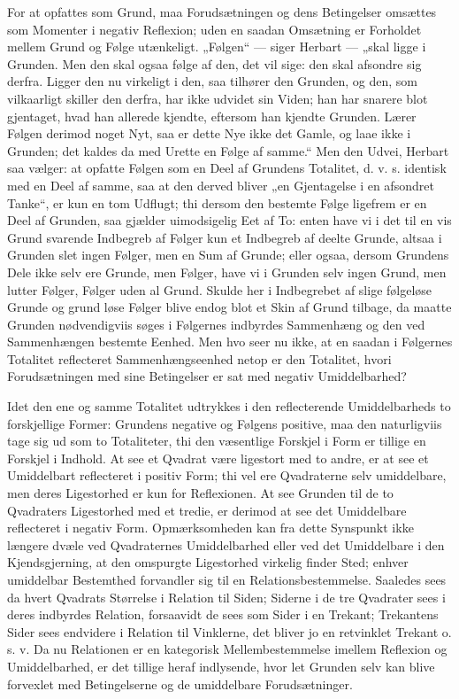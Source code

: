 \documentclass[11pt]{book}
\newcommand{\opage}[1]{\marginnote{\footnotesize\textit{[#1]}}}
\begin{document}
\opage{88} \setcounter{footnote}{0}%
For at opfattes som Grund, maa Forudsætningen og dens
Betingelser omsættes som Momenter i negativ Reflexion; uden
en saadan Omsætning er Forholdet mellem Grund og Følge
utænkeligt. „Følgen“ --- siger Herbart --- „skal ligge i
Grunden. Men den skal ogsaa følge af den, det vil sige: den
skal afsondre sig derfra. Ligger den nu virkeligt i den, saa
tilhører den Grunden, og den, som vilkaarligt skiller den
derfra, har ikke udvidet sin Viden; han har snarere blot
gjentaget, hvad han allerede kjendte, eftersom han kjendte
Grunden. Lærer Følgen derimod noget Nyt, saa er dette Nye
ikke det Gamle, og laae ikke i Grunden; det kaldes da med
Urette en Følge af samme.“ Men den Udvei, Herbart saa
vælger: at opfatte Følgen som en Deel af Grundens Totalitet,
d. v. s. identisk med en Deel af samme, saa at den derved
bliver „en Gjentagelse i en afsondret Tanke“, er kun en tom
Udflugt; thi dersom den bestemte Følge ligefrem er en Deel af
Grunden, saa gjælder uimodsigelig Eet af To: enten have vi i
det til en vis Grund svarende Indbegreb af Følger kun et
Indbegreb af deelte Grunde, altsaa i Grunden slet ingen
Følger, men en Sum af Grunde; eller ogsaa, dersom Grundens
Dele ikke selv ere Grunde, men Følger, have vi i Grunden
selv ingen Grund, men lutter Følger, Følger uden al Grund.
Skulde her i Indbegrebet af slige følgeløse Grunde og
grund\-%
\opage{89} \setcounter{footnote}{0}%
løse Følger blive endog blot et Skin af Grund tilbage, da
maatte Grunden nødvendigviis søges i Følgernes indbyrdes
Sammenhæng og den ved Sammenhængen bestemte Eenhed.
Men hvo seer nu ikke, at en saadan i Følgernes Totalitet
reflecteret Sammenhængseenhed netop er den Totalitet, hvori
Forudsætningen med sine Betingelser er sat med negativ
Umiddelbarhed?

Idet den ene og samme Totalitet udtrykkes i den reflecterende
Umiddelbarheds to forskjellige Former: Grundens negative og
Følgens positive, maa den naturligviis tage sig ud som to
Totaliteter, thi den væsentlige Forskjel i Form er tillige en
Forskjel i Indhold. At see et Qvadrat være ligestort med to
andre, er at see et Umiddelbart reflecteret i positiv Form; thi
vel ere Qvadraterne selv umiddelbare, men deres Ligestorhed
er kun for Reflexionen. At see Grunden til de to Qvadraters
Ligestorhed med et tredie, er derimod at see det Umiddelbare
reflecteret i negativ Form. Opmærksomheden kan fra dette
Synspunkt ikke længere dvæle ved Qvadraternes
Umiddelbarhed eller ved det Umiddelbare i den Kjendsgjerning,
at den omspurgte Ligestorhed virkelig finder Sted; enhver
umiddelbar Bestemthed forvandler sig til en
Relationsbestemmelse. Saaledes sees da hvert Qvadrats
Størrelse i Relation til Siden; Siderne i de tre Qvadrater sees
i deres indbyrdes Relation, forsaavidt de sees som Sider i en
Trekant; Trekantens Sider sees endvidere i Relation til
Vinklerne, det bliver jo en retvinklet Trekant o. s. v. Da nu
Relationen er en kategorisk Mellembestemmelse imellem
Reflexion og Umiddelbarhed, er det tillige heraf indlysende,
hvor let Grunden selv kan blive forvexlet med Betingelserne og
de umiddelbare Forudsætninger.
\end{document}
